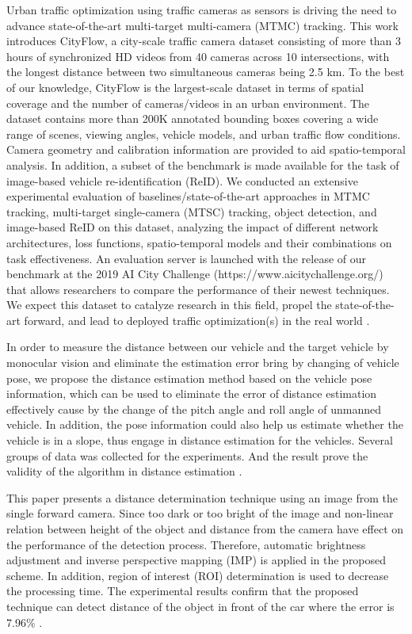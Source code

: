 Urban traffic optimization using traffic cameras as sensors is driving the need to advance state-of-the-art multi-target multi-camera (MTMC) tracking. This work introduces CityFlow, a city-scale traffic camera dataset consisting of more than 3 hours of synchronized HD videos from 40 cameras across 10 intersections, with the longest distance between two simultaneous cameras being 2.5 km. To the best of our knowledge, CityFlow is the largest-scale dataset in terms of spatial coverage and the number of cameras/videos in an urban environment. The dataset contains more than 200K annotated bounding boxes covering a wide range of scenes, viewing angles, vehicle models, and urban traffic flow conditions. Camera geometry and calibration information are provided to aid spatio-temporal analysis. In addition, a subset of the benchmark is made available for the task of image-based vehicle re-identification (ReID). We conducted an extensive experimental evaluation of baselines/state-of-the-art approaches in MTMC tracking, multi-target single-camera (MTSC) tracking, object detection, and image-based ReID on this dataset, analyzing the impact of different network architectures, loss functions, spatio-temporal models and their combinations on task effectiveness. An evaluation server is launched with the release of our benchmark at the 2019 AI City Challenge (https://www.aicitychallenge.org/) that allows researchers to compare the performance of their newest techniques. We expect this dataset to catalyze research in this field, propel the state-of-the-art forward, and lead to deployed traffic optimization(s) in the real world \cite{Tang2019}.

In order to measure the distance between our vehicle and the target vehicle by monocular vision and eliminate the estimation error bring by changing of vehicle pose, we propose the distance estimation method based on the vehicle pose information, which can be used to eliminate the error of distance estimation effectively cause by the change of the pitch angle and roll angle of unmanned vehicle. In addition, the pose information could also help us estimate whether the vehicle is in a slope, thus engage in distance estimation for the vehicles. Several groups of data was collected for the experiments. And the result prove the validity of the algorithm in distance estimation \cite{Qi2019}.

This paper presents a distance determination technique using an image from the single forward camera. Since too dark or too bright of the image and non-linear relation between height of the object and distance from the camera have effect on the performance of the detection process. Therefore, automatic brightness adjustment and inverse perspective mapping (IMP) is applied in the proposed scheme. In addition, region of interest (ROI) determination is used to decrease the processing time. The experimental results confirm that the proposed technique can detect distance of the object in front of the car where the error is 7.96\% \cite{Wongsaree2018}.

